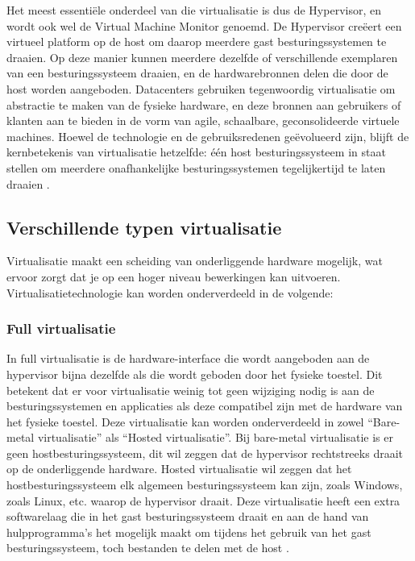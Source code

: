 Het meest essentiële onderdeel van die virtualisatie is dus de Hypervisor, en wordt ook wel de Virtual Machine Monitor genoemd. De Hypervisor creëert een virtueel platform op de host om daarop meerdere gast besturingssystemen te draaien. Op deze manier kunnen meerdere dezelfde of verschillende exemplaren van een besturingssysteem draaien, en de hardwarebronnen delen die door de host worden aangeboden. Datacenters gebruiken tegenwoordig virtualisatie om abstractie te maken van de fysieke hardware, en deze bronnen aan gebruikers of klanten aan te bieden in de vorm van agile, schaalbare, geconsolideerde virtuele machines. Hoewel de technologie en de gebruiksredenen geëvolueerd zijn, blijft de kernbetekenis van virtualisatie hetzelfde: één host besturingssysteem in staat stellen om meerdere onafhankelijke besturingssystemen tegelijkertijd te laten draaien \autocite{Oracle2012}.

\subsection{Verschillende typen virtualisatie}

Virtualisatie maakt een scheiding van onderliggende hardware mogelijk, wat ervoor zorgt dat je op een hoger niveau bewerkingen kan uitvoeren. Virtualisatietechnologie kan worden onderverdeeld in de volgende: 

\subsubsection{Full virtualisatie}

In full virtualisatie is de hardware-interface die wordt aangeboden aan de hypervisor bijna dezelfde als die wordt geboden door het fysieke toestel. Dit betekent dat er voor virtualisatie weinig tot geen wijziging nodig is aan de besturingssystemen en applicaties als deze compatibel zijn met de hardware van het fysieke toestel. Deze virtualisatie kan worden onderverdeeld in zowel “Bare-metal virtualisatie” als “Hosted virtualisatie”. Bij bare-metal virtualisatie is er geen hostbesturingssysteem, dit wil zeggen dat de hypervisor rechtstreeks draait op de onderliggende hardware. Hosted virtualisatie wil zeggen dat het hostbesturingssysteem elk algemeen besturingssysteem kan zijn, zoals Windows, zoals Linux, etc. waarop de hypervisor draait. Deze virtualisatie heeft een extra softwarelaag die in het gast besturingssysteem draait en aan de hand van hulpprogramma's het mogelijk maakt om tijdens het gebruik van het gast besturingssysteem, toch bestanden te delen met de host \autocite{Kedia2013}.

